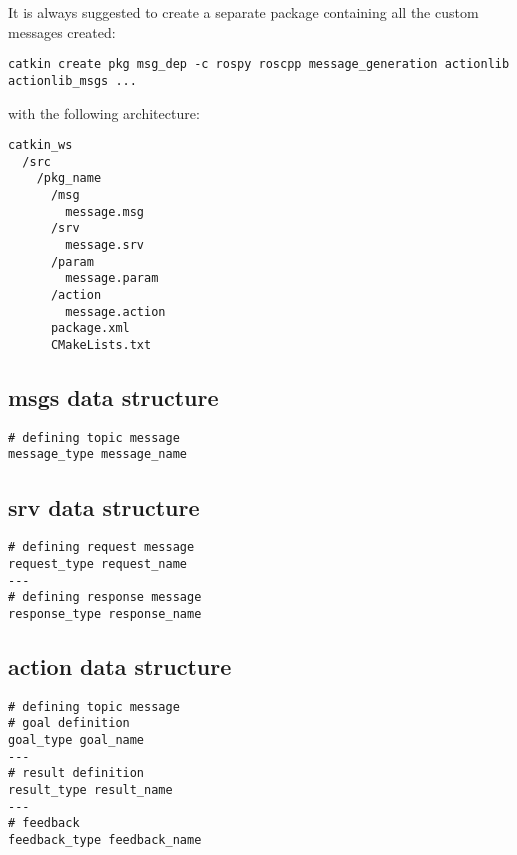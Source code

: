             It is always suggested to create a separate package containing all the custom messages created:
\begin{verbatim}
catkin create pkg msg_dep -c rospy roscpp message_generation actionlib actionlib_msgs ...
\end{verbatim}
            with the following architecture:
\begin{verbatim}
catkin_ws
  /src
    /pkg_name
      /msg
        message.msg
      /srv
        message.srv
      /param
        message.param
      /action
        message.action
      package.xml
      CMakeLists.txt
\end{verbatim}
        
        
        \subsection{msgs data structure}
\begin{verbatim}
# defining topic message
message_type message_name
\end{verbatim}
        
        \subsection{srv data structure}
\begin{verbatim}
# defining request message
request_type request_name
---
# defining response message
response_type response_name
\end{verbatim}

        \subsection{action data structure}
\begin{verbatim}
# defining topic message
# goal definition
goal_type goal_name
---
# result definition
result_type result_name
---
# feedback
feedback_type feedback_name
\end{verbatim}
        

